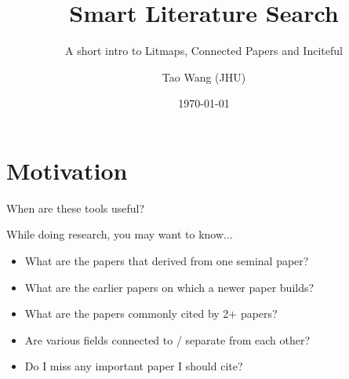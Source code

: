 \documentclass[aspectratio=43]{beamer}
\title{Smart Literature Search}
\subtitle{A short intro to Litmaps, Connected Papers and Inciteful}
\date{\today}
\author{Tao Wang (JHU)}
\begin{document}
\begin{frame}
\maketitle

\end{frame}

\section{Motivation}

\begin{transitionframe}
When are these tools useful?
\end{transitionframe}

\begin{frame}{While doing research, you may want to know...}\label{main1}
 
    \begin{itemize}
        \item What are the papers that derived from one seminal paper?
        \item What are the earlier papers on which a newer paper builds?
        \item What are the papers commonly cited by 2+ papers?
        \item Are various fields connected to / separate from each other?
        \item Do I miss any important paper I should cite?
    \end{itemize}
\end{frame}
\end{document}
